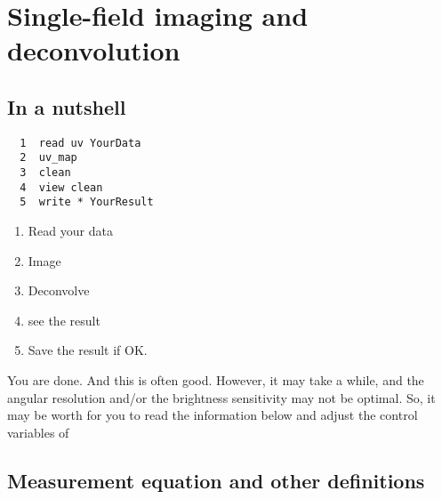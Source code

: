 \section{Single-field imaging and deconvolution}

\subsection{In a nutshell}

\begin{verbatim}
  1  read uv YourData
  2  uv_map
  3  clean
  4  view clean
  5  write * YourResult
\end{verbatim}
\begin{enumerate}\itemsep 0pt
\item Read your \uv{} data
\item Image 
\item Deconvolve
\item see the result
\item Save the result if OK.
\end{enumerate}
You are done. And this is often good. However, it may take a while, and
the angular resolution and/or the brightness sensitivity may not be optimal.
So, it may be worth for you to read the information below and adjust
the control variables of  

\subsection{Measurement equation and other definitions}

